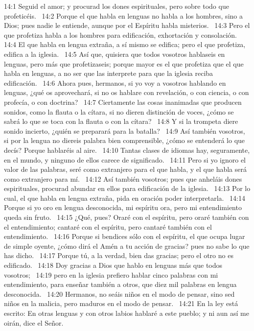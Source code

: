14:1 Seguid el amor; y procurad los dones espirituales, pero sobre todo que profeticéis.  
14:2 Porque el que habla en lenguas no habla a los hombres, sino a Dios; pues nadie le entiende, aunque por el Espíritu habla misterios.  
14:3 Pero el que profetiza habla a los hombres para edificación, exhortación y consolación.  
14:4 El que habla en lengua extraña, a sí mismo se edifica; pero el que profetiza, edifica a la iglesia.  
14:5 Así que, quisiera que todos vosotros hablaseis en lenguas, pero más que profetizaseis; porque mayor es el que profetiza que el que habla en lenguas, a no ser que las interprete para que la iglesia reciba edificación.  
14:6 Ahora pues, hermanos, si yo voy a vosotros hablando en lenguas, ¿qué os aprovechará, si no os hablare con revelación, o con ciencia, o con profecía, o con doctrina?  
14:7 Ciertamente las cosas inanimadas que producen sonidos, como la flauta o la cítara, si no dieren distinción de voces, ¿cómo se sabrá lo que se toca con la flauta o con la cítara?  
14:8 Y si la trompeta diere sonido incierto, ¿quién se preparará para la batalla?  
14:9 Así también vosotros, si por la lengua no diereis palabra bien comprensible, ¿cómo se entenderá lo que decís? Porque hablaréis al aire.  
14:10 Tantas clases de idiomas hay, seguramente, en el mundo, y ninguno de ellos carece de significado.  
14:11 Pero si yo ignoro el valor de las palabras, seré como extranjero para el que habla, y el que habla será como extranjero para mí.  
14:12 Así también vosotros; pues que anheláis dones espirituales, procurad abundar en ellos para edificación de la iglesia.  
14:13 Por lo cual, el que habla en lengua extraña, pida en oración poder interpretarla.  
14:14 Porque si yo oro en lengua desconocida, mi espíritu ora, pero mi entendimiento queda sin fruto.  
14:15 ¿Qué, pues? Oraré con el espíritu, pero oraré también con el entendimiento; cantaré con el espíritu, pero cantaré también con el entendimiento.  
14:16 Porque si bendices sólo con el espíritu, el que ocupa lugar de simple oyente, ¿cómo dirá el Amén a tu acción de gracias? pues no sabe lo que has dicho.  
14:17 Porque tú, a la verdad, bien das gracias; pero el otro no es edificado.  
14:18 Doy gracias a Dios que hablo en lenguas más que todos vosotros;  
14:19 pero en la iglesia prefiero hablar cinco palabras con mi entendimiento, para enseñar también a otros, que diez mil palabras en lengua desconocida.  
14:20 Hermanos, no seáis niños en el modo de pensar, sino sed niños en la malicia, pero maduros en el modo de pensar.  
14:21 En la ley está escrito: En otras lenguas y con otros labios hablaré a este pueblo; y ni aun así me oirán, dice el Señor. 
